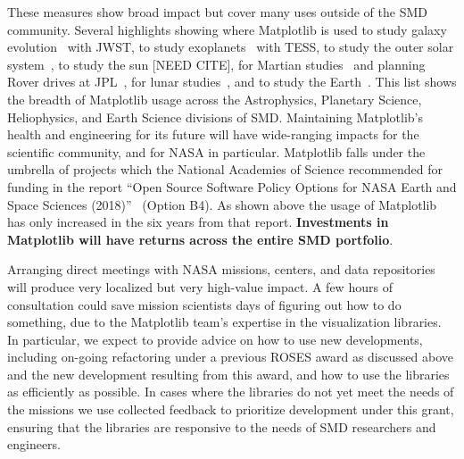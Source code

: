 \documentclass[12pt]{article}
\numberwithin{page}{section}
\begin{document}
These measures show broad impact but cover many uses outside of the
SMD community.  Several highlights showing where Matplotlib is used
to study galaxy evolution~\cite{2022ApJ...940L..14N} with JWST,
to study exoplanets~\cite{2020AJ....160..116G, Barclay_2018,2019AJ....158...27L} with TESS,
to study the outer solar system~\cite{Emran_2023},
to study the sun [NEED CITE],
for Martian studies~\cite{2022JE007697} and planning Rover drives at JPL~\cite{acurtis},
for lunar studies~\cite{NESNAS2023163},
and to study the Earth~\cite{paolo_2024}.
This list shows the breadth of Matplotlib usage across the Astrophysics,
Planetary Science, Heliophysics, and Earth Science divisions of SMD.
Maintaining Matplotlib's health and engineering for its future will
have wide-ranging impacts for the scientific community, and for NASA in
particular.
Matplotlib falls under the umbrella of projects which the National Academies of
Science recommended for funding in the report ``Open Source Software Policy
Options for NASA Earth and Space Sciences (2018)''~\cite{NAP25217} (Option B4).
As shown above the usage of Matplotlib has only increased in the six years from
that report.  \textbf{Investments in Matplotlib will have returns across the
  entire SMD portfolio}.


Arranging direct meetings with NASA missions, centers, and data repositories
will produce very localized but very high-value impact.  A few hours of
consultation could save mission scientists days of figuring out how to do
something, due to the Matplotlib team's expertise in the visualization
libraries.  In particular, we expect to provide advice on how to use new
developments, including on-going refactoring under a previous ROSES award as
discussed above and the new development resulting from this award, and how to
use the libraries as efficiently as possible.  In cases where the libraries do
not yet meet the needs of the missions we use collected feedback to prioritize
development under this grant, ensuring that the libraries are responsive to the
needs of SMD researchers and engineers.
\end{document}
